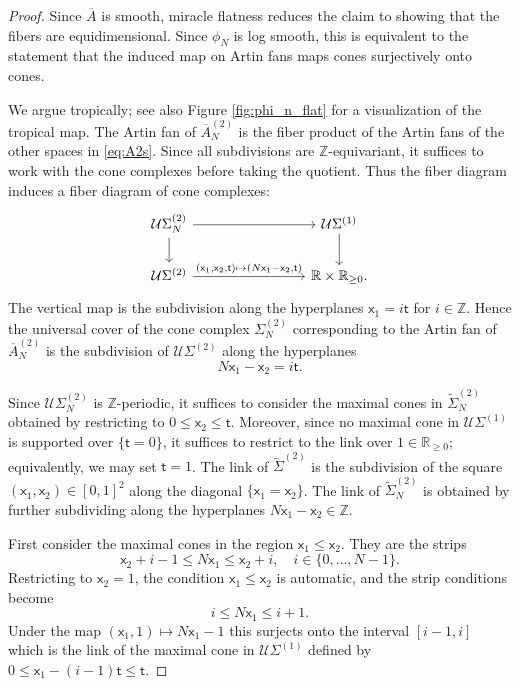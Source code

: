 \documentclass[11pt]{article}
\def\ZZ{\mathbb{Z}}
\newcommand{\RR}{\mathbb{R}}
\newcommand{\barA}{\overline{A}}
\theoremstyle{definition}
\begin{document}
\begin{proof}
	Since $\barA$ is smooth, miracle flatness reduces the claim to showing that the fibers are equidimensional. Since $\phi_N$ is log smooth, this is equivalent to the statement that the induced map on Artin fans maps cones surjectively onto cones.

	We argue tropically; see also Figure \ref{fig:phi_n_flat} for a visualization of the tropical map. The Artin fan of $\barA_N^{(2)}$ is the fiber product of the Artin fans of the other spaces in \eqref{eq:A2s}. Since all subdivisions are $\ZZ$-equivariant, it suffices to work with the cone complexes before taking the quotient. Thus the fiber diagram induces a fiber diagram of cone complexes:
	$$\begin{tikzcd}[column sep=8em]
		\mathcal U\Sigma_N^{(2)}\arrow[d]\arrow[r]&\mathcal U\Sigma^{(1)}\arrow[d]\\
		\mathcal U\Sigma^{(2)}\arrow[r,"{(\mathsf{x}_1,\mathsf{x}_2,\mathsf{t})\mapsto (N\mathsf{x}_1-\mathsf{x}_2,\mathsf{t})}"]&\mathbb{R}\times\mathbb{R}_{\ge 0}.
	\end{tikzcd}$$
	The vertical map is the subdivision along the hyperplanes $\mathsf{x}_1=i\mathsf{t}$ for
    $i\in \ZZ$. Hence the universal cover of the cone complex $\Sigma_N^{(2)}$
    corresponding to the Artin fan of $\barA_N^{(2)}$ is the subdivision of
    $\mathcal U\Sigma^{(2)}$ along the hyperplanes
    \[
    N\mathsf{x}_1-\mathsf{x}_2=i\mathsf{t}.
    \]

    Since $\mathcal U\Sigma_N^{(2)}$ is $\ZZ$-periodic, it suffices to consider the maximal cones in $\tilde{\Sigma}_N^{(2)}$ obtained by restricting to $0 \leq \mathsf{x}_2 \leq \mathsf{t}$. Moreover, since no maximal cone in $\mathcal U\Sigma^{(1)}$ is supported over $\{\mathsf{t}=0\}$, it suffices to restrict to the link over $1\in \RR_{\geq 0}$; equivalently, we may set $\mathsf{t}=1$.
    The link of $\tilde{\Sigma}^{(2)}$ is the subdivision of the square
    $(\mathsf{x}_1,\mathsf{x}_2)\in [0,1]^{2}$ along the diagonal $\{\mathsf{x}_1=\mathsf{x}_2\}$. The link of $\tilde{\Sigma}_N^{(2)}$ is obtained by further subdividing
    along the hyperplanes $N\mathsf{x}_1-\mathsf{x}_2\in \mathbb{Z}$.

    First consider the maximal cones in the region $\mathsf{x}_1 \leq \mathsf{x}_2$. They are the strips
    \[
    \mathsf{x}_2+i-1 \leq N\mathsf{x}_1 \leq \mathsf{x}_2+i,
    \quad
    i \in \{0,\ldots,N-1\}.
    \]
    Restricting to $\mathsf{x}_2=1$, the condition $\mathsf{x}_1\leq \mathsf{x}_2$ is automatic, and the
    strip conditions become
    \[
    i \leq N\mathsf{x}_1 \leq i+1.
    \]
     Under the map
	$(\mathsf{x}_1,1)\mapsto N\mathsf{x}_1-1$ this surjects onto the interval $[i-1,i]$ which is the link of the maximal cone in $\mathcal U\Sigma^{(1)}$
	defined by $0\le \mathsf{x}_1-(i-1)\mathsf{t}\le \mathsf{t}$.


\end{proof}
\end{document}
